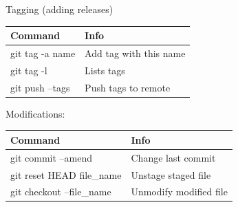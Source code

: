 \documentclass[12 pt]{article}
\begin{document}
Tagging (adding releases)
\begin{tabularx}{1.0\linewidth}{|X|X|}
\hline \textbf{Command} & \textbf{Info}
  \\ \hline git tag -a name& Add tag with this name
  \\ \hline git tag -l & Lists tags
  \\ \hline git push --tags & Push tags to remote
  \\ \hline
\end{tabularx}
Modifications:
\begin{tabularx}{1.0\linewidth}{|X|X|}
  \hline \textbf{Command}& \textbf{Info}
  \\ \hline git commit --amend & Change last commit
  \\ \hline git reset HEAD file\_name & Unstage staged file
  \\ \hline git checkout --file\_name & Unmodify modified file
  \\ \hline
\end{tabularx}
\end{document}
